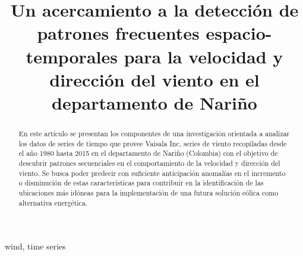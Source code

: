 \documentclass[conference]{IEEEtran}
\begin{document}
\pagestyle{empty}  


\title{Un acercamiento a la detección de patrones frecuentes espacio-temporales para la velocidad y dirección del viento en el departamento de Nariño}

\author{
\and
{}
}

\maketitle

\begin{abstract}

En este artículo se presentan los componentes de una investigación orientada
 a analizar los datos de series de tiempo que provee Vaisala Inc, series de viento recopiladas desde
 el año 1980 hasta 2015 en el departamento de Nariño (Colombia) con el objetivo
 de descubrir patrones secuenciales en el comportamiento de la velocidad
 y dirección del viento.
 Se busca poder predecir con suficiente anticipación anomalías en el incremento
 o disminución de estas características para contribuir en la identificación
 de las ubicaciones más idóneas para la implementación de una futura solución
 eólica como alternativa energética.
\end{abstract}
 


\begin{IEEEkeywords}
wind, time series 
\end{IEEEkeywords}

\thispagestyle{empty} 

\IEEEpeerreviewmaketitle







\end{document}

